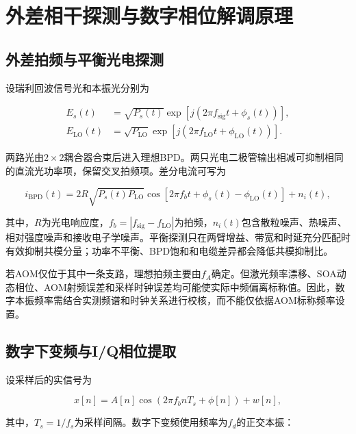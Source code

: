 \section{外差相干探测与数字相位解调原理}

\subsection{外差拍频与平衡光电探测}

设瑞利回波信号光和本振光分别为

\begin{align}
E_s(t)&=\sqrt{P_s(t)}\exp\!\left[j(2\pi f_{\mathrm{sig}} t+\phi_s(t))\right],\\
E_{\mathrm{LO}}(t)&=\sqrt{P_{\mathrm{LO}}}\exp\!\left[j(2\pi f_{\mathrm{LO}}t+\phi_{\mathrm{LO}}(t))\right].
\end{align}

两路光由$2\times2$耦合器合束后进入理想BPD。两只光电二极管输出相减可抑制相同的直流光功率项，保留交叉拍频项。差分电流可写为

\begin{equation}
i_{\mathrm{BPD}}(t)
=
2R\sqrt{P_s(t)P_{\mathrm{LO}}}
\cos\!\left[
2\pi f_b t+\phi_s(t)-\phi_{\mathrm{LO}}(t)
\right]
+n_i(t),
\label{eq:bpd}
\end{equation}

其中，$R$为光电响应度，$f_b=|f_{\mathrm{sig}}-f_{\mathrm{LO}}|$为拍频，$n_i(t)$包含散粒噪声、热噪声、相对强度噪声和接收电子学噪声。平衡探测只在两臂增益、带宽和时延充分匹配时有效抑制共模分量；功率不平衡、BPD饱和和电缆差异都会降低共模抑制比\cite{lu2010distributed,pan2011phase,liokumovich2015fundamentals}。

若AOM仅位于其中一条支路，理想拍频主要由$f_A$确定。但激光频率漂移、SOA动态相位、AOM射频误差和采样时钟误差均可能使实际中频偏离标称值。因此，数字本振频率需结合实测频谱和时钟关系进行校核，而不能仅依据AOM标称频率设置。

\subsection{数字下变频与I/Q相位提取}

设采样后的实信号为

\begin{equation}
x[n]
=
A[n]\cos\!\left(2\pi f_b nT_s+\phi[n]\right)+w[n],
\label{eq:sampled_if}
\end{equation}

其中，$T_s=1/f_s$为采样间隔。数字下变频使用频率为$f_d$的正交本振：

